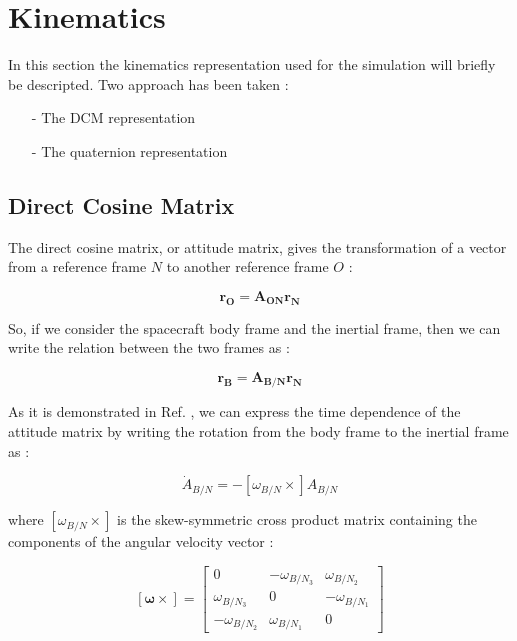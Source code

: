 \section{Kinematics}
In this section the kinematics representation used for the simulation will briefly be descripted. Two approach has been taken : 
\begin{itemize}
 \item [-] The DCM representation
 \item [-] The quaternion representation
\end{itemize}

\subsection{Direct Cosine Matrix}
The direct cosine matrix, or attitude matrix, gives the transformation of a vector from a reference frame $N$ to another reference frame $O$ : 

\begin{equation}
 \mathbf{r_{O}} = \mathbf{A_{ON}} \mathbf{r_{N}}
\end{equation}

So, if we consider the spacecraft body frame and the inertial frame, then we can write the relation between the two frames as : 

\begin{equation}
 \mathbf{r_{B}} = \mathbf{A_{B/N}} \mathbf{r_{N}}
\end{equation}

As it is demonstrated in Ref. \cite{Markley2014}, we can express the time dependence of the attitude matrix by writing the rotation from the body frame to the inertial frame as : 

\begin{equation}
 \dot{A}_{B/N}= - [\omega_{B/N} \times]A_{B/N} 
\end{equation}

where $[\omega_{B/N} \times]$ is the skew-symmetric cross product matrix containing the components of the angular velocity vector : 

\begin{equation*}
 \mathbf{[\omega \times]} =
                                \begin{bmatrix}
                                    0 & -\omega_{B/N_{3}} & \omega_{B/N_{2}} \\
                                    \omega_{B/N_{3}} & 0 & -\omega_{B/N_{1}} \\
                                    -\omega_{B/N_{2}} & \omega_{B/N_{1}} & 0
                                \end{bmatrix}
\end{equation*}

